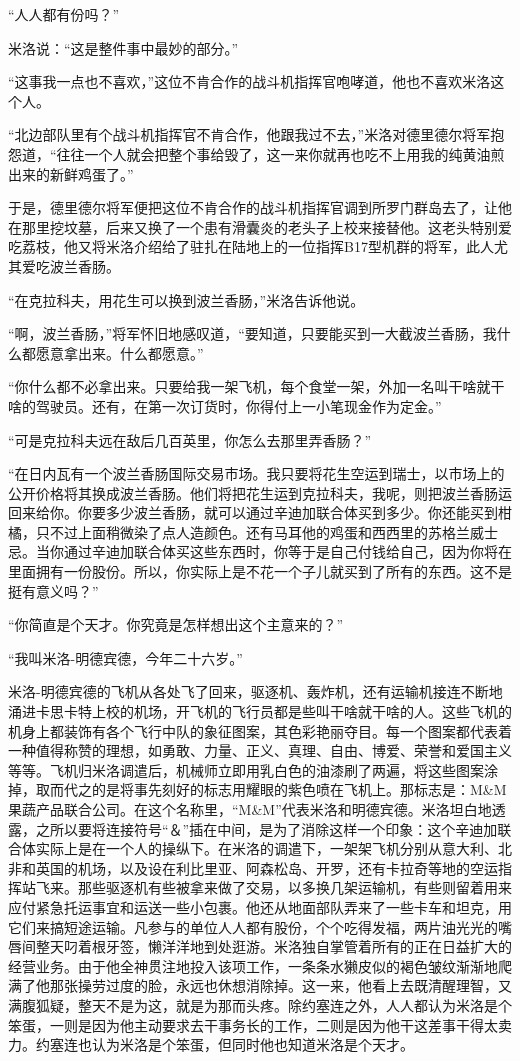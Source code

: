     “人人都有份吗？”

    米洛说：“这是整件事中最妙的部分。”

    “这事我一点也不喜欢，”这位不肯合作的战斗机指挥官咆哮道，他也不喜欢米洛这个人。

    “北边部队里有个战斗机指挥官不肯合作，他跟我过不去，”米洛对德里德尔将军抱怨道，“往往一个人就会把整个事给毁了，这一来你就再也吃不上用我的纯黄油煎出来的新鲜鸡蛋了。”

    于是，德里德尔将军便把这位不肯合作的战斗机指挥官调到所罗门群岛去了，让他在那里挖坟墓，后来又换了一个患有滑囊炎的老头子上校来接替他。这老头特别爱吃荔枝，他又将米洛介绍给了驻扎在陆地上的一位指挥B17型机群的将军，此人尤其爱吃波兰香肠。

    “在克拉科夫，用花生可以换到波兰香肠，”米洛告诉他说。

    “啊，波兰香肠，”将军怀旧地感叹道，“要知道，只要能买到一大截波兰香肠，我什么都愿意拿出来。什么都愿意。”

    “你什么都不必拿出来。只要给我一架飞机，每个食堂一架，外加一名叫干啥就干啥的驾驶员。还有，在第一次订货时，你得付上一小笔现金作为定金。”

    “可是克拉科夫远在敌后几百英里，你怎么去那里弄香肠？”

    “在日内瓦有一个波兰香肠国际交易市场。我只要将花生空运到瑞士，以市场上的公开价格将其换成波兰香肠。他们将把花生运到克拉科夫，我呢，则把波兰香肠运回来给你。你要多少波兰香肠，就可以通过辛迪加联合体买到多少。你还能买到柑橘，只不过上面稍微染了点人造颜色。还有马耳他的鸡蛋和西西里的苏格兰威士忌。当你通过辛迪加联合体买这些东西时，你等于是自己付钱给自己，因为你将在里面拥有一份股份。所以，你实际上是不花一个子儿就买到了所有的东西。这不是挺有意义吗？”

    “你简直是个天才。你究竟是怎样想出这个主意来的？”

    “我叫米洛-明德宾德，今年二十六岁。”

    米洛-明德宾德的飞机从各处飞了回来，驱逐机、轰炸机，还有运输机接连不断地涌进卡思卡特上校的机场，开飞机的飞行员都是些叫干啥就干啥的人。这些飞机的机身上都装饰有各个飞行中队的象征图案，其色彩艳丽夺目。每一个图案都代表着一种值得称赞的理想，如勇敢、力量、正义、真理、自由、博爱、荣誉和爱国主义等等。飞机归米洛调遣后，机械师立即用乳白色的油漆刷了两遍，将这些图案涂掉，取而代之的是将事先刻好的标志用耀眼的紫色喷在飞机上。那标志是：M&M果蔬产品联合公司。在这个名称里，“M&M”代表米洛和明德宾德。米洛坦白地透露，之所以要将连接符号“＆”插在中间，是为了消除这样一个印象：这个辛迪加联合体实际上是在一个人的操纵下。在米洛的调遣下，一架架飞机分别从意大利、北非和英国的机场，以及设在利比里亚、阿森松岛、开罗，还有卡拉奇等地的空运指挥站飞来。那些驱逐机有些被拿来做了交易，以多换几架运输机，有些则留着用来应付紧急托运事宜和运送一些小包裹。他还从地面部队弄来了一些卡车和坦克，用它们来搞短途运输。凡参与的单位人人都有股份，个个吃得发福，两片油光光的嘴唇间整天叼着根牙签，懒洋洋地到处逛游。米洛独自掌管着所有的正在日益扩大的经营业务。由于他全神贯注地投入该项工作，一条条水獭皮似的褐色皱纹渐渐地爬满了他那张操劳过度的脸，永远也休想消除掉。这一来，他看上去既清醒理智，又满腹狐疑，整天不是为这，就是为那而头疼。除约塞连之外，人人都认为米洛是个笨蛋，一则是因为他主动要求去干事务长的工作，二则是因为他干这差事干得太卖力。约塞连也认为米洛是个笨蛋，但同时他也知道米洛是个天才。

